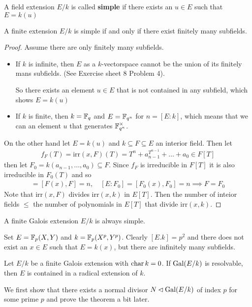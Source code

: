 \begin{dfn}[]
	A field extension $E/k$ is called \textbf{simple} if there exists an $u \in E$ such that $E = k(u)$
\end{dfn}
\begin{prop}
	A finite extension $E/k$ is simple if and only if there exist finitely many subfields.
\end{prop}
\begin{proof}
	Assume there are only finitely many subfields.
	\begin{itemize}
		\item If $k$ is infinite, then $E$ as a $k$-vectorspace cannot be the union of its finitely mans subfields. (See Exercise sheet 8 Problem 4).

			So there exists an element $u \in E$ that is not contained in any subfield, which shows $E = k(u)$
		\item If $k$ is finite, then $k = \mathbb{F}_q$ and $E = \mathbb{F}_{q^{n}}$ for $n = [E:k]$, which means that we can an element $u$ that generates $\mathbb{F}_{q^{n}}^{\times}$.
	\end{itemize}
	
	On the other hand let $E = k(u)$ and $k \subseteq F \subseteq E$ an interior field. Then let
	\begin{align*}
		f_F(T) = \text{irr}(x,F)(T) = T^{n} + a_{n-1}^{T^{n-1}} + \ldots + a_0 \in F[T]
	\end{align*}
	then let $F_0 = k(a_{n-1},\ldots,a_0) \subseteq F$.
	Since $f_F$ is irreducible in $F[T]$ it is also irreducible in $F_0(T)$ and so
	\begin{align*}
		[E:F] = [F(x),F] = n, \quad [E:F_0] = [F_0(x),F_0] = n \implies F = F_0
	\end{align*}
	Note that $\text{irr}(x,F)$ divides $\text{irr}(x,k)$ in $E[T]$.
	Then the number of inteior fields $\leq$ the number of polynomials in $E[T]$ that divide $\text{irr}(x,k)$.
\end{proof}


\begin{cor}
	A finite Galois extension $E/k$ is always simple.
\end{cor}

\begin{ex}[]
  Set $E = \mathbb{F}_p(X,Y)$ and $k = \mathbb{F}_p(X^{p},Y^{p})$. 
  Clearly $[E.k] = p^{2}$ and there does not exist an $x \in E$ such that $E = k(x)$, but there are infinitely many subfields.
\end{ex}

\begin{thm}[]\label{4-24}
  Let $E/k$ be a finite Galois extension with $\operatorname{char} k = 0$. If $\operatorname{Gal}(E/k)$ is resolvable, then $E$ is contained in a radical extension of $k$.
\end{thm}
We first show that there exists a normal divisor $N \lhd \operatorname{Gal}(E/k)$ of index $p$ for some prime $p$ and prove the theorem a bit later.

